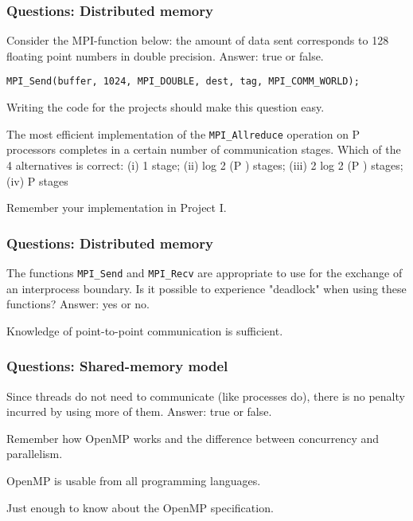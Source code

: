\begin{frame}[fragile]
  \frametitle{Questions: Distributed memory}

\begin{ex}[2011]
Consider the MPI-function below: the amount of data sent corresponds to 128 floating point numbers in double precision.
Answer: true or false.
\end{ex}

{\scriptsize
\begin{lstlisting}[style=c]
MPI_Send(buffer, 1024, MPI_DOUBLE, dest, tag, MPI_COMM_WORLD);
\end{lstlisting}
}

Writing the code for the projects should make this question easy.

\begin{ex}[2011]
The most efficient implementation of the \texttt{MPI\_Allreduce} operation on P processors
completes in a certain number of communication stages. Which of the 4 alternatives is correct: (i) 1 stage; (ii) log 2 (P ) stages; (iii) 2 log 2 (P ) stages; (iv) P stages
\end{ex}

Remember your implementation in Project I.

\end{frame}

\begin{frame}[fragile]
  \frametitle{Questions: Distributed memory}

\begin{ex}[2011]
The functions \texttt{MPI\_Send} and \texttt{MPI\_Recv} are appropriate to use for the exchange of an interprocess boundary. Is it possible to experience "deadlock" when using these functions? Answer: yes or no.
\end{ex}

Knowledge of point-to-point communication is sufficient.


\end{frame}

\begin{frame}[fragile]
  \frametitle{Questions: Shared-memory model}


\begin{ex}[2016]
Since threads do not need to communicate (like processes do), there is no
penalty incurred by using more of them. Answer: true or false.
\end{ex}

Remember how OpenMP works and the difference between concurrency and parallelism.

\begin{ex}[2014]
OpenMP is usable from all programming languages.
\end{ex}

Just enough to know about the OpenMP specification.

\end{frame}

